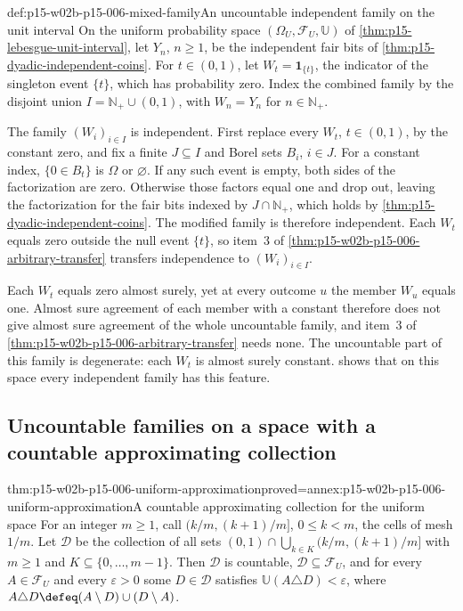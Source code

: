 \begin{hbexample}{def:p15-w02b-p15-006-mixed-family}{An uncountable independent family on the unit interval}
On the uniform probability space \((\Omega_U,\mathcal F_U,\mathbb U)\)
of \cref{thm:p15-lebesgue-unit-interval}, let \(Y_n\), \(n\geq1\), be
the independent fair bits of \cref{thm:p15-dyadic-independent-coins}.
For \(t\in(0,1)\), let \(W_t=\mathbf1_{\{t\}}\), the indicator of the
singleton event \(\{t\}\), which has probability zero. Index the
combined family by the disjoint union
\(I=\mathbb N_+\cup(0,1)\), with \(W_n=Y_n\) for \(n\in\mathbb N_+\).

The family \((W_i)_{i\in I}\) is independent. First replace every
\(W_t\), \(t\in(0,1)\), by the constant zero, and fix a finite
\(J\subseteq I\) and Borel sets \(B_i\), \(i\in J\). For a constant
index, \(\{0\in B_t\}\) is \(\Omega\) or \(\varnothing\). If any such
event is empty, both sides of the factorization are zero. Otherwise those
factors equal one and drop out, leaving the factorization for the fair
bits indexed by \(J\cap\mathbb N_+\), which holds by
\cref{thm:p15-dyadic-independent-coins}. The modified family is
therefore independent. Each \(W_t\) equals zero outside the null event
\(\{t\}\), so item~3 of \cref{thm:p15-w02b-p15-006-arbitrary-transfer}
transfers independence to \((W_i)_{i\in I}\).

Each \(W_t\) equals zero almost surely, yet at every outcome \(u\) the
member \(W_u\) equals one. Almost sure agreement of each member with a
constant therefore does not give almost sure agreement of the whole
uncountable family, and item~3 of
\cref{thm:p15-w02b-p15-006-arbitrary-transfer} needs none. The
uncountable part of this family is degenerate: each \(W_t\) is almost
surely constant.  shows that
on this space every independent family has this feature.
\end{hbexample}

\subsection{Uncountable families on a space with a countable approximating collection}
\label{sec:p15-w02b-p15-006-uncountable-limit}

\begin{hblemma}{thm:p15-w02b-p15-006-uniform-approximation}{proved=annex:p15-w02b-p15-006-uniform-approximation}{A countable approximating collection for the uniform space}
For an integer \(m\geq1\), call \((k/m,(k+1)/m]\), \(0\leq k<m\),
the cells of mesh \(1/m\). Let \(\mathcal D\) be the collection of all
sets \((0,1)\cap\bigcup_{k\in K}(k/m,(k+1)/m]\) with \(m\geq1\) and
\(K\subseteq\{0,\ldots,m-1\}\). Then \(\mathcal D\) is countable,
\(\mathcal D\subseteq\mathcal F_U\), and for every \(A\in\mathcal F_U\)
and every \(\varepsilon>0\) some \(D\in\mathcal D\) satisfies
\(\mathbb U(A\triangle D)<\varepsilon\), where
\(A\triangle D\defeq(A\setminus D)\cup(D\setminus A)\).
\end{hblemma}

